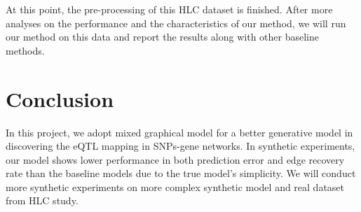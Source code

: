 \documentclass{article}
\begin{document}
At this point, the pre-processing of this HLC dataset is finished. After more analyses on the performance and the characteristics of our method, we will run our method on this data and report the results along with other baseline methods.

\section{Conclusion}
In this project, we adopt mixed graphical model for a better generative model in discovering the eQTL mapping in SNPs-gene networks. In synthetic experiments, our model shows lower performance in both prediction error and edge recovery rate than the baseline models due to the true model's simplicity. We will conduct more synthetic experiments on more complex synthetic model and real dataset from HLC study.



\nocite{*}


\end{document}
